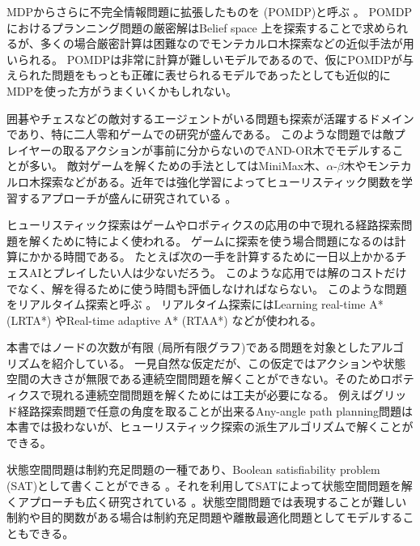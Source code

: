 MDPからさらに不完全情報問題に拡張したものを (POMDP)と呼ぶ \cite{kaelbling1998planning}。
POMDPにおけるプランニング問題の厳密解はBelief space \cite{kaelbling1998planning}上を探索することで求められるが、多くの場合厳密計算は困難なのでモンテカルロ木探索などの近似手法が用いられる。
POMDPは非常に計算が難しいモデルであるので、仮にPOMDPが与えられた問題をもっとも正確に表せられるモデルであったとしても近似的にMDPを使った方がうまくいくかもしれない。

囲碁やチェスなどの敵対するエージェントがいる問題も探索が活躍するドメインであり、特に二人零和ゲームでの研究が盛んである。
このような問題では敵プレイヤーの取るアクションが事前に分からないのでAND-OR木でモデルすることが多い。
敵対ゲームを解くための手法としてはMiniMax木、$\alpha$-$\beta$木\cite{pearl84}やモンテカルロ木探索などがある。近年では強化学習によってヒューリスティック関数を学習するアプローチが盛んに研究されている \cite{sutton:99}。

ヒューリスティック探索はゲームやロボティクスの応用の中で現れる経路探索問題を解くために特によく使われる。
ゲームに探索を使う場合問題になるのは計算にかかる時間である。
たとえば次の一手を計算するために一日以上かかるチェスAIとプレイしたい人は少ないだろう。
このような応用では解のコストだけでなく、解を得るために使う時間も評価しなければならない。
このような問題をリアルタイム探索と呼ぶ \cite{korf90,barto1995learning}。
リアルタイム探索にはLearning real-time A* (LRTA*) \cite{korf90,koenig2001minimax}やReal-time adaptive A* (RTAA*) \cite{koenig2006real}などが使われる。

本書ではノードの次数が有限 (局所有限グラフ)である問題を対象としたアルゴリズムを紹介している。
一見自然な仮定だが、この仮定ではアクションや状態空間の大きさが無限である連続空間問題を解くことができない。そのためロボティクスで現れる連続空間問題を解くためには工夫が必要になる。
例えばグリッド経路探索問題で任意の角度を取ることが出来るAny-angle path planning問題は本書では扱わないが、ヒューリスティック探索の派生アルゴリズムで解くことができる\cite{lavalle2006planning,lavalle2001rapidly,daniel2010theta,nash2013any}。

状態空間問題は制約充足問題の一種であり、Boolean satisfiability problem (SAT)として書くことができる \cite{garey1979computers}。それを利用してSATによって状態空間問題を解くアプローチも広く研究されている \cite{kautz1992planning,kautz2006satplan,rintanen2012planning}。状態空間問題では表現することが難しい制約や目的関数がある場合は制約充足問題や離散最適化問題としてモデルすることもできる。
